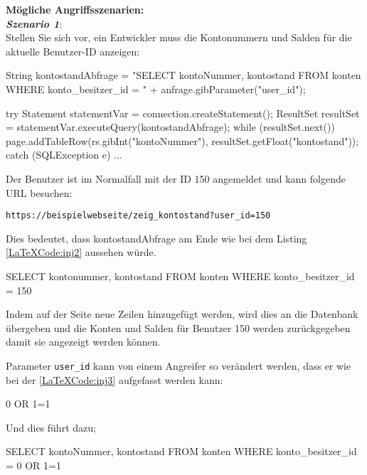 \textbf{Mögliche Angriffsszenarien:}\\

\textbf{\textit{Szenario 1}}:\\
Stellen Sie sich vor, ein Entwickler muss die Kontonummern und Salden für die aktuelle Benutzer-ID anzeigen\cite{vcinj16}:\\


\begin{LaTeXCode}[caption={SQL Abfrage Beispiel 1},captionpos=b, label=LaTeXCode:inj1][numbers=none]
String kontostandAbfrage = 
"SELECT kontoNummer, kontostand FROM konten WHERE konto\_besitzer\_id = " 
+ anfrage.gibParameter("user_id");

try
{
	Statement statementVar = connection.createStatement();
	ResultSet resultSet = statementVar.executeQuery(kontostandAbfrage);
	while (resultSet.next()) {
		page.addTableRow(rs.gibInt("kontoNummer"), resultSet.getFloat("kontostand"));
	}
} catch (SQLException e) { ... }
\end{LaTeXCode}

Der Benutzer ist im Normalfall mit der ID 150 angemeldet und kann folgende URL besuchen:

\texttt{https://beispielwebseite/zeig\_kontostand?user\_id=150}

Dies bedeutet, dass kontostandAbfrage am Ende wie bei dem Listing \ref{LaTeXCode:inj2} aussehen würde.

\begin{LaTeXCode}[caption={Account Balance Query},captionpos=b, label=LaTeXCode:inj2][numbers=none]
SELECT kontonummer, kontostand FROM konten WHERE konto_besitzer_id = 150
\end{LaTeXCode}

Indem auf der Seite neue Zeilen hinzugefügt werden, wird dies an die Datenbank übergeben und die Konten und Salden für Benutzer 150 werden zurückgegeben damit sie angezeigt werden können.

Parameter \texttt{user\_id} kann von einem Angreifer so verändert werden, dass er wie bei der \ref{LaTeXCode:inj3} aufgefasst werden kann:

\begin{LaTeXCode}[caption={Parameter},captionpos=b, label=LaTeXCode:inj3][numbers=none]
0 OR 1=1
\end{LaTeXCode}

Und dies führt dazu;

\begin{LaTeXCode}[caption={Account Balance Query},captionpos=b, label=LaTeXCode:inj4][numbers=none]
SELECT kontoNummer, kontostand FROM konten WHERE konto_besitzer_id = 0 OR 1=1
\end{LaTeXCode}

